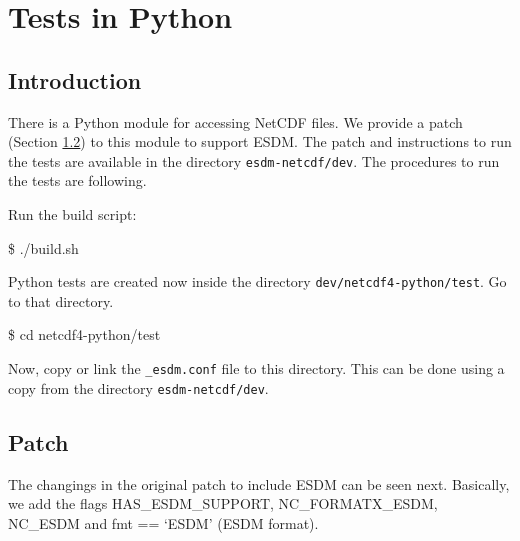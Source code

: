 \chapter{Tests in Python}
\label{ch:python}

\section{Introduction}

There is a Python module for accessing NetCDF files. We provide a patch (Section \ref{sec:patch}) to this module to support ESDM.
The patch and instructions to run the tests are available in the directory \texttt{esdm-netcdf/dev}.
The procedures to run the tests are following.

Run the build script:

\begin{framed}
\$ ./build.sh
\end{framed}

Python tests are created now inside the directory \texttt{dev/netcdf4-python/test}.
Go to that directory.

\begin{framed}
\$ cd netcdf4-python/test
\end{framed}

Now, copy or link the \texttt{\_esdm.conf} file to this directory.
This can be done using a copy from the directory \texttt{esdm-netcdf/dev}.

\section{Patch}
\label{sec:patch}

The changings in the original patch to include ESDM can be seen next.
Basically, we add the flags HAS\_ESDM\_SUPPORT, NC\_FORMATX\_ESDM, NC\_ESDM and fmt == `ESDM' (ESDM format).\\

